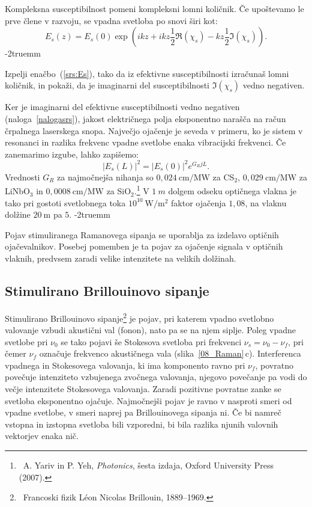 Kompleksna susceptibilnost pomeni kompleksni lomni količnik. Če upoštevamo
le prve člene v razvoju, se vpadna svetloba po snovi širi 
kot:
\begin{equation}
E_s(z) = E_s(0)\exp\left(i k z + ikz\frac{1}{2}\Re(\chi_s)- k z \frac{1}{2}\Im(\chi_s)\right)\!\!.
\label{srs:Es}
\end{equation}
\vglue-2truemm
\begin{naloga}
\label{nalogasrs}
Izpelji enačbo~(\ref{srs:Es}), tako da iz efektivne susceptibilnosti izračunaš lomni količnik,
in pokaži, da je imaginarni del susceptibilnosti $\Im(\chi_s)$ vedno negativen. 
\end{naloga}
Ker je imaginarni del efektivne susceptibilnosti vedno negativen (naloga~\ref{nalogasrs}), 
jakost e\-lek\-trič\-nega polja eksponentno narašča na račun črpalnega laserskega snopa. 
Največjo ojačenje je seveda v primeru, ko je sistem v resonanci
in razlika frekvenc vpadne svetlobe enaka vibracijski frekvenci.
Če zanemarimo izgube, lahko zapišemo:
\begin{equation}
|E_s(L)|^2 = |E_s(0)|^2 e^{G_RjL}.
\end{equation}
Vrednosti $G_R$ za najmočnejša nihanja so $0,024~\si{\cm/\mega\watt}$ za CS$_2$, 
$0,029~\si{\cm/\mega\watt}$ za LiNbO$_3$ 
in $0,0008~\si{\cm/\mega\watt}$ za SiO$_2$.\footnote{~A. Yariv in 
P. Yeh, {\it Photonics}, šesta izdaja, Oxford University Press (2007).}
V $1~\si{m}$ dolgem odseku optičnega vlakna je tako pri gostoti svetlobnega toka 
$10^{10}~\si{\watt/\meter^2}$ faktor ojačenja $1,08$, na vlaknu dolžine $20~\si{\metre}$
pa $5$.
\vglue-2truemm
\begin{remark}
Pojav stimuliranega Ramanovega sipanja se uporablja za izdelavo optičnih 
ojačevalnikov. Posebej pomemben je ta pojav za ojačenje signala v 
optičnih vlaknih, predvsem zaradi velike intenzitete na velikih dolžinah.
\end{remark}

\subsection*{Stimulirano Brillouinovo sipanje}
Stimulirano Brillouinovo sipanje\footnote{~Francoski fizik L\'eon Nicolas Brillouin, 1889--1969.} je pojav, pri katerem vpadno svetlobno valovanje
vzbudi akustični val (fonon), nato pa se na njem siplje. Poleg vpadne svetlobe pri $\nu_0$
se tako pojavi še Stokesova svetloba pri frekvenci $\nu_s = \nu_0-\nu_f$, pri čemer 
$\nu_f$ označuje frekvenco akustičnega vala  (slika~\ref{08_Raman}\,c). Interferenca
vpadnega in Stokesovega valovanja, ki ima komponento ravno pri $\nu_f$, povratno
povečuje intenziteto vzbujenega zvočnega valovanja, njegovo povečanje pa vodi do
večje intenzitete Stokesovega valovanja. Zaradi pozitivne povratne zanke se 
svetloba eksponentno ojačuje. Najmočnejši pojav je 
ravno v nasproti smeri od vpadne svetlobe, v smeri naprej pa Brillouinovega sipanja ni.
Če bi namreč vstopna in izstopna svetloba bili vzporedni, bi bila razlika njunih
valovnih vektorjev enaka nič. 


